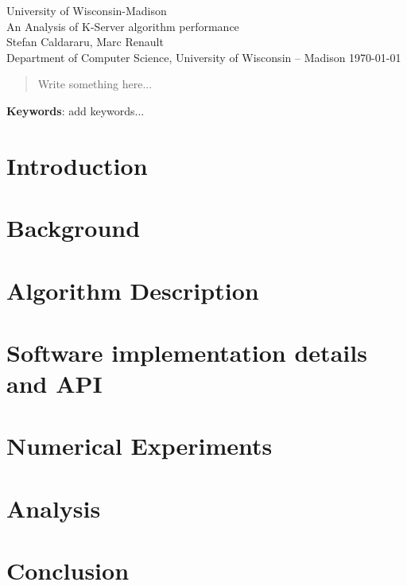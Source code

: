 \documentclass[11pt]{article}
\begin{document}
	
\begin{titlepage}
	\begin{center}
		University of Wisconsin-Madison \\
		\vfill 
		\LARGE An Analysis of K-Server algorithm performance\\
		\vspace{0.5in}
		\Large Stefan Caldararu, Marc Renault\\
		\vspace{0.2in}
		{\normalsize Department of Computer Science, University of Wisconsin -- Madison}	
		\vfill		
		\today		
	\end{center}
\end{titlepage}

\newpage 

\begin{abstract} 
Write something here...
\end{abstract}

{\textbf{Keywords}}: add keywords...

\newpage 

\tableofcontents

\newpage

\section{Introduction}
\label{sec:intro}


\section{Background}
\label{sec:background}


\pagebreak
\section{Algorithm Description}
\label{sec:algDescription}


\section{Software implementation details and API}
\label{sec:implementationDetails}


\section{Numerical Experiments}
\label{sec:numExperiments}


\section{Analysis}
\label{sec:analysis}


\section{Conclusion}
\label{sec:conclusion}





\end{document}
